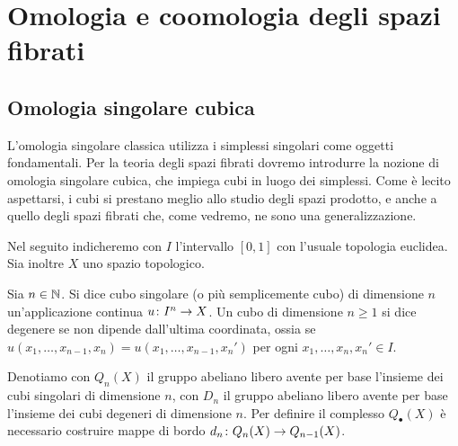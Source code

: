 \chapter{Omologia e coomologia degli spazi fibrati}
\label{chapter-fibration}

\section{Omologia singolare cubica}

L'omologia singolare classica utilizza i simplessi singolari come oggetti fondamentali. Per la teoria degli spazi fibrati dovremo introdurre la nozione di omologia singolare cubica, che impiega cubi in luogo dei simplessi. Come è lecito aspettarsi, i cubi si prestano meglio allo studio degli spazi prodotto, e anche a quello degli spazi fibrati che, come vedremo, ne sono una generalizzazione.

Nel seguito indicheremo con $I$ l'intervallo $[0,1]$ con l'usuale topologia euclidea. Sia inoltre $X$ uno spazio topologico.

\begin{definition}
Sia $n\in\mathbb{N}$. Si dice cubo singolare (o più semplicemente cubo) di dimensione $n$ un'applicazione continua $u\colon I^n\to X$. Un cubo di dimensione $n\ge 1$ si dice degenere se non dipende dall'ultima coordinata, ossia se $u(x_1,\ldots,x_{n-1},x_n)=u(x_1,\ldots,x_{n-1},x_n')$ per ogni $x_1,\ldots,x_n,x_n'\in I$.
\end{definition}

Denotiamo con $Q_n(X)$ il gruppo abeliano libero avente per base l'insieme dei cubi singolari di dimensione $n$, con $D_n$ il gruppo abeliano libero avente per base l'insieme dei cubi degeneri di dimensione $n$. Per definire il complesso $Q_\bullet(X)$ è necessario costruire mappe di bordo $d_n\colon Q_n(X)\to Q_{n-1}(X)$.

